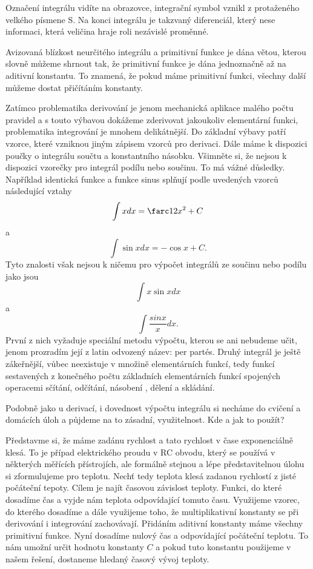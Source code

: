 \documentclass[12pt]{article}
\begin{document}
Označení integrálu vidíte na obrazovce, integrační symbol vznikl z protaženého velkého písmene S. Na konci integrálu je takzvaný diferenciál, který nese informaci, která veličina hraje roli nezávislé proměnné.

Avizovaná blízkost neurčitého integrálu a primitivní funkce je dána větou, kterou slovně můžeme shrnout tak, že primitivní funkce je dána jednoznačně až na aditivní konstantu. To znamená, že pokud máme primitivní funkci, všechny další můžeme dostat přičítáním konstanty.

Zatímco problematika derivování je jenom mechanická aplikace malého počtu pravidel a s touto výbavou dokážeme zderivovat jakoukoliv elementární funkci, problematika integrování je mnohem delikátnější. Do základní výbavy patří vzorce, které vzniknou jiným zápisem vzorců pro derivaci. Dále máme k dispozici poučky o integrálu součtu a konstantního násobku. Všimněte si, že nejsou k dispozici vzorečky pro integrál podílu nebo součinu. To má vážné důsledky. Například identická funkce a funkce sinus splňují podle uvedených vzorců následující vztahy
$$\int x dx = \farc 12 x^2+C$$
a
$$\int\sin xdx=-\cos x+C.$$
Tyto znalosti však nejsou k ničemu pro výpočet integrálů ze součinu nebo podílu jako jsou $$\int x\sin xdx$$ a $$\int \frac{sin x}{x}dx.$$ První z nich vyžaduje speciální metodu výpočtu, kterou se ani nebudeme učit, jenom prozradím její z latin odvozený název: per partés. Druhý integrál je ještě zákeřnější, vůbec neexistuje v množině elementárních funkcí, tedy funkcí sestavených z konečného počtu základních elementárních funkcí spojených operacemi sčítání, odčítání, násobení , dělení a skládání.

Podobně jako u derivací, i dovednost výpočtu integrálu si necháme do cvičení a domácích úloh a půjdeme na to zásadní, využitelnost. Kde a jak to použít?

Představme si, že máme zadánu rychlost a tato rychlost v čase exponenciálně klesá. To je případ elektrického proudu v RC obvodu, který se používá v některých měřících přístrojích, ale formálně stejnou a lépe představitelnou úlohu si zformulujeme pro teplotu. Nechť tedy teplota klesá zadanou rychlostí z jisté počáteční tepoty. Cílem je najít časovou závislost teploty. Funkci, do které dosadíme čas a vyjde nám teplota odpovídající tomuto času. Využijeme vzorec, do kterého dosadíme a dále využijeme toho, že multiplikativní konstanty se při derivování i integrování zachovávají. Přidáním aditivní konstanty máme všechny primitivní funkce. Nyní dosadíme nulový čas a odpovídající počáteční teplotu. To nám umožní určit hodnotu konstanty $C$ a pokud tuto konstantu použijeme v našem řešení, dostaneme hledaný časový vývoj teploty.
\end{document}
